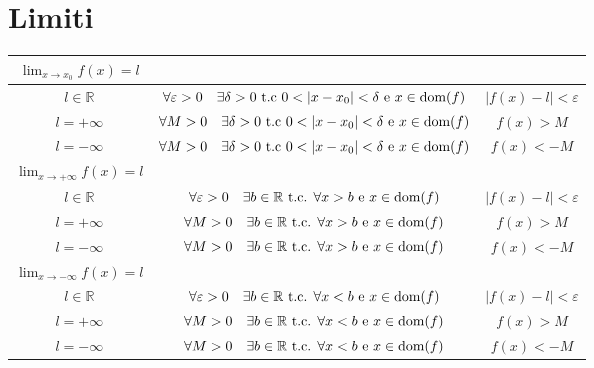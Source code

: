 \documentclass[12pt, a4paper]{report}
\begin{document}
    \section{Limiti}
    \begin{center}
        \begin{tabular}{|c|c|c|}
            \hline
            $\lim_{x\to x_{0}}f(x)=l$ & &\\
            \hline
            $l\in \mathbb{R}$ & $\forall\varepsilon>0\quad\exists\delta>0\text{ t.c }0<|x-x_{0}|<\delta \text{ e } x\in\dom{f}$ & $|f(x)-l|<\varepsilon$\\
            \hline
            $l=+\infty$ & $\forall M>0\quad\exists\delta>0\text{ t.c }0<|x-x_{0}|<\delta \text{ e } x\in\dom{f}$ & $f(x)>M$\\
            \hline
            $l=-\infty$ & $\forall M>0\quad\exists\delta>0\text{ t.c }0<|x-x_{0}|<\delta \text{ e } x\in\dom{f}$ & $f(x)<-M$\\
            \hline
            $\lim_{x\to +\infty}f(x)=l$ & &\\
            \hline
            $l\in \mathbb{R}$ & $\forall \varepsilon>0\quad\exists b\in\mathbb{R} \text{ t.c. } \forall x>b \text{ e }x\in\text{dom}(f)$ & $|f(x)-l|<\varepsilon$\\
            \hline
            $l=+\infty$ & $\forall M>0\quad\exists b\in\mathbb{R} \text{ t.c. } \forall x>b \text{ e }x\in\text{dom}(f)$ & $f(x)>M$\\
            \hline
            $l=-\infty$ & $\forall M>0\quad\exists b\in\mathbb{R} \text{ t.c. } \forall x>b \text{ e }x\in\text{dom}(f)$ & $f(x)<-M$\\
            \hline
            $\lim_{x\to -\infty}f(x)=l$ & &\\
            \hline
            $l\in \mathbb{R}$ & $\forall \varepsilon>0\quad\exists b\in\mathbb{R} \text{ t.c. } \forall x<b \text{ e }x\in\text{dom}(f)$ & $|f(x)-l|<\varepsilon$\\
            \hline
            $l=+\infty$ & $\forall M>0\quad\exists b\in\mathbb{R} \text{ t.c. } \forall x<b \text{ e }x\in\text{dom}(f)$ & $f(x)>M$\\
            \hline
            $l=-\infty$ & $\forall M>0\quad\exists b\in\mathbb{R} \text{ t.c. } \forall x<b \text{ e }x\in\text{dom}(f)$ & $f(x)<-M$\\
            \hline
        \end{tabular}
    \end{center}
\end{document}
